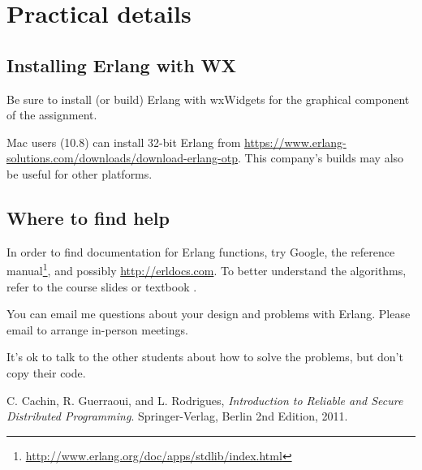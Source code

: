 \documentclass[a4paper]{article}
\begin{document}
\section{Practical details} %
\label{sec:practical_details}


\subsection{Installing Erlang with WX} %
\label{sub:installing_erlang_and_wx}

Be sure to install (or build) Erlang with wxWidgets for the graphical
component of the assignment.

Mac users (10.8) can install 32-bit Erlang from
\url{https://www.erlang-solutions.com/downloads/download-erlang-otp}. This
company's builds may also be useful for other platforms.






\subsection{Where to find help} %
\label{sub:where_to_find_help}

In order to find documentation for Erlang functions, try Google, the reference
manual\footnote{\url{http://www.erlang.org/doc/apps/stdlib/index.html}}, and
possibly \url{http://erldocs.com}.
To better understand the algorithms, refer to the course slides or textbook
\cite{cachin2011}.

You can email me questions about your design and problems with Erlang. Please
email to arrange in-person meetings.

It's ok to talk to the other students about how to solve the problems, but
don't copy their code.











\begin{thebibliography}{9}

  C. Cachin, R. Guerraoui, and L. Rodrigues,
  \emph{Introduction to Reliable and Secure Distributed Programming}.
  Springer-Verlag, Berlin
  2nd Edition,
  2011.

\end{thebibliography}
\end{document}
